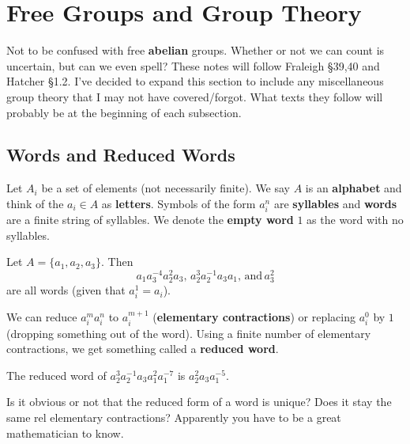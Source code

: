 \section{Free Groups and Group Theory}
Not to be confused with free \textbf{abelian} groups. Whether or not we can count is uncertain, but can we even spell? These notes will follow Fraleigh \S 39,40 and Hatcher \S 1.2.
\orbreak
I've decided to expand this section to include any miscellaneous group theory that I may not have covered/forgot. What texts they follow will probably be at the beginning of each subsection.
\subsection{Words and Reduced Words}
Let $A_i$ be a set of elements (not necessarily finite). We say $A$ is an \textbf{alphabet} and think of the $a_i\in A$ as \textbf{letters}. Symbols of the form $a_{i}^{n}$ are \textbf{syllables} and \textbf{words} are a finite string of syllables. We denote the \textbf{empty word} $1$ as the word with no syllables.
\begin{example}
    Let $A=\{a_1,a_2,a_3\}.$ Then \[
        a_1a_3^{-4}a_2^{2}a_3, \, a_2^{3}a_2^{-1}a_3a_1, \, \text{and} \, a_3^2
    \] are all words (given that $a_i^{1}=a_i$).
\end{example}
We can reduce $a_i^{m}a_i^n$ to $a_i^{m+1}$ (\textbf{elementary contractions}) or replacing $a_i^{0}$ by $1$ (dropping something out of the word). Using a finite number of elementary contractions, we get something called a \textbf{reduced word}.
\begin{example}
    The reduced word of $a_2^{3}a_2^{-1}a_3a_1^2a_1^{-7}$ is $a_2^2a_3a_1^{-5}$.
\end{example}
Is it obvious or not that the reduced form of a word is unique? Does it stay the same rel elementary contractions? Apparently you have to be a great mathematician to know.
